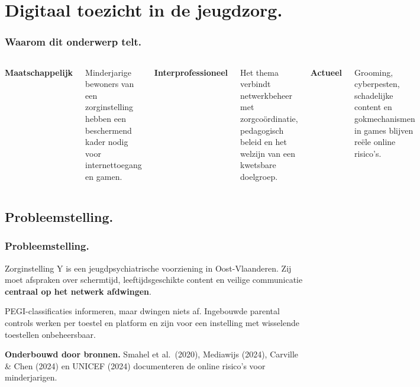 \documentclass[aspectratio=169]{beamer}
\begin{document}
\section{Digitaal toezicht in de jeugdzorg.}

\begin{frame}
    \frametitle{Waarom dit onderwerp telt.}

    \begin{columns}[t]
        \textbf{Maatschappelijk}

        \medskip
        Minderjarige bewoners van een zorginstelling hebben een
        beschermend kader nodig voor internettoegang en gamen.

        \textbf{Interprofessioneel}

        \medskip
        Het thema verbindt netwerkbeheer met zorgcoördinatie,
        pedagogisch beleid en het welzijn van een kwetsbare doelgroep.

        \textbf{Actueel}

        \medskip
        Grooming, cyberpesten, schadelijke content en gokmechanismen in
        games blijven reële online risico's.
    \end{columns}
\end{frame}

\subsection{Probleemstelling.}

\begin{frame}
    \frametitle{Probleemstelling.}

    Zorginstelling Y is een jeugdpsychiatrische voorziening in
    Oost-Vlaanderen. Zij moet afspraken over schermtijd, leeftijdsgeschikte
    content en veilige communicatie \textbf{centraal op het netwerk
    afdwingen}.

    \bigskip

    PEGI-classificaties informeren, maar dwingen niets af. Ingebouwde
    parental controls werken per toestel en platform en zijn voor een
    instelling met wisselende toestellen onbeheersbaar.

    \bigskip
    \bigskip

    \textcolor{hggrey}{\textbf{Onderbouwd door bronnen.}} Smahel et al.\
    (2020), Mediawijs (2024), Carville \& Chen (2024) en UNICEF (2024)
    documenteren de online risico's voor minderjarigen.
\end{frame}
\end{document}
